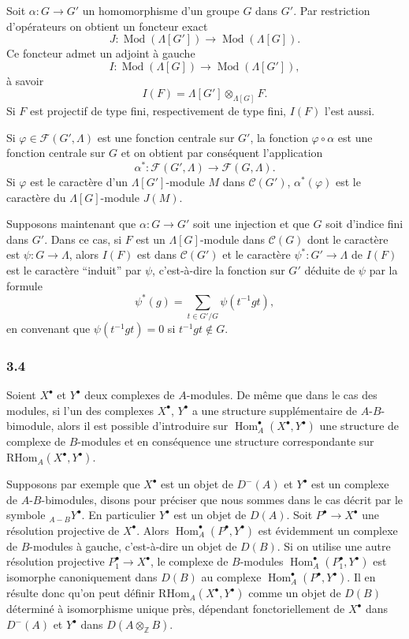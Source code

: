 \documentclass[11pt]{article}
\DeclareMathOperator{\Hom}{Hom}
\newcommand{\R}{\mathrm{R}}\newcommand{\RHomCore}{\mathrm{RHom}}
\providecommand{\RHom}{\RHomCore}
\providecommand{\RHom}{\RHomCore}
\providecommand{\Hom}{\operatorname{Hom}}
\providecommand{\RHom}{\R\mathcal{H}om}
\providecommand{\R}{\mathrm R}
\providecommand{\Mod}{\operatorname{Mod}}
\providecommand{\RHom}{\RHomCore}
\providecommand{\Hom}{\operatorname{Hom}}
\begin{document}
Soit $\alpha:G\to G'$ un homomorphisme d'un groupe $G$ dans $G'$. Par restriction d'opérateurs on obtient un foncteur exact
\[
J:\Mod(\Lambda[G'])\longrightarrow\Mod(\Lambda[G]).
\]
Ce foncteur admet un adjoint à gauche
\[
I:\Mod(\Lambda[G])\longrightarrow\Mod(\Lambda[G']),
\]
à savoir
\[
I(F)=\Lambda[G']\otimes_{\Lambda[G]}F.
\]
Si $F$ est projectif de type fini, respectivement de type fini, $I(F)$ l'est aussi.

Si $\varphi\in\mathcal F(G',\Lambda)$ est une fonction centrale sur $G'$, la fonction $\varphi\circ\alpha$ est une fonction centrale sur $G$ et on obtient par conséquent l'application
\[
\alpha^*: \mathcal F(G',\Lambda)\longrightarrow\mathcal F(G,\Lambda).
\]
Si $\varphi$ est le caractère d'un $\Lambda[G']$-module $M$ dans $\mathcal C(G')$, $\alpha^*(\varphi)$ est le caractère du $\Lambda[G]$-module $J(M)$.

Supposons maintenant que $\alpha:G\to G'$ soit une injection et que $G$ soit d'indice fini dans $G'$. Dans ce cas, si $F$ est un $\Lambda[G]$-module dans $\mathcal C(G)$ dont le caractère est $\psi:G\to\Lambda$, alors $I(F)$ est dans $\mathcal C(G')$ et le caractère $\psi^*:G'\to\Lambda$ de $I(F)$ est le caractère ``induit'' par $\psi$, c'est-à-dire la fonction sur $G'$ déduite de $\psi$ par la formule
\[
\psi^*(g)=\sum_{t\in G'/G}\psi(t^{-1}gt),
\tag{3.3.1}
\]
en convenant que $\psi(t^{-1}gt)=0$ si $t^{-1}gt\notin G$.

\subsubsection*{3.4}

Soient $X^\bullet$ et $Y^\bullet$ deux complexes de $A$-modules. De même que dans le cas des modules, si l'un des complexes $X^\bullet$, $Y^\bullet$ a une structure supplémentaire de $A$-$B$-bimodule, alors il est possible d'introduire sur $\Hom_A^\bullet(X^\bullet,Y^\bullet)$ une structure de complexe de $B$-modules et en conséquence une structure correspondante sur $\RHom_A(X^\bullet,Y^\bullet)$.

Supposons par exemple que $X^\bullet$ est un objet de $D^-(A)$ et $Y^\bullet$ est un complexe de $A$-$B$-bimodules, disons pour préciser que nous sommes dans le cas décrit par le symbole ${}_{A-B}Y^\bullet$. En particulier $Y^\bullet$ est un objet de $D(A)$. Soit $P^\bullet\to X^\bullet$ une résolution projective de $X^\bullet$. Alors $\Hom_A^\bullet(P^\bullet,Y^\bullet)$ est évidemment un complexe de $B$-modules à gauche, c'est-à-dire un objet de $D(B)$. Si on utilise une autre résolution projective $P_1^\bullet\to X^\bullet$, le complexe de $B$-modules $\Hom_A^\bullet(P_1^\bullet,Y^\bullet)$ est isomorphe canoniquement dans $D(B)$ au complexe $\Hom_A^\bullet(P^\bullet,Y^\bullet)$. Il en résulte donc qu'on peut définir $\RHom_A(X^\bullet,Y^\bullet)$ comme un objet de $D(B)$ déterminé à isomorphisme unique près, dépendant fonctoriellement de $X^\bullet$ dans $D^-(A)$ et $Y^\bullet$ dans $D(A\otimes_{\mathbb Z}B)$.
\end{document}
